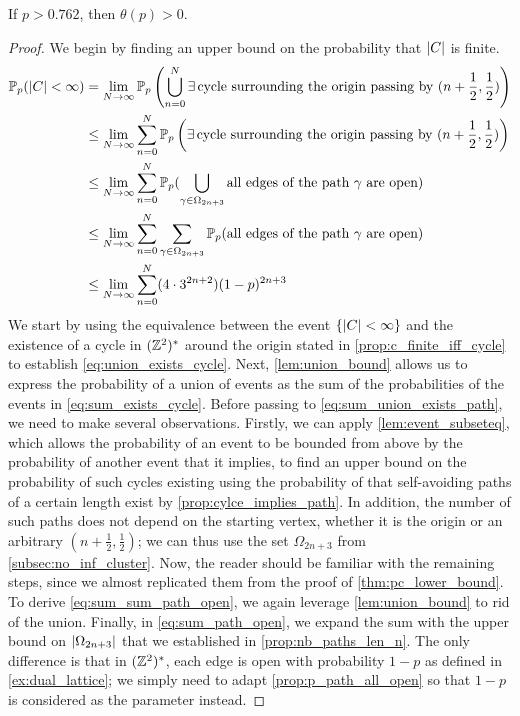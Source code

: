 \documentclass[a4paper, 12pt]{article}
\begin{document}
\begin{thm}\label{thm:pc_higher_bound}
If $p > 0.762$, then $\theta(p) > 0$.
\end{thm}
\begin{proof}
We begin by finding an upper bound on the probability that $\lvert C \rvert$ is finite.
\begin{align}
    \mathbb{P}_p(\lvert C \rvert < \infty)
    &= \lim_{N \to \infty} \mathbb{P}_p\left(\bigcup_{n = 0}^N \exists\,\text{cycle surrounding the origin passing by } (n + \frac{1}{2}, \frac{1}{2})\right)\label{eq:union_exists_cycle}\\
    &\leq \lim_{N \to \infty} \sum_{n = 0}^N \mathbb{P}_p\left(\exists\,\text{cycle surrounding the origin passing by } (n + \frac{1}{2}, \frac{1}{2})\right)\label{eq:sum_exists_cycle}\\
    &\leq \lim_{N \to \infty} \sum_{n = 0}^N \mathbb{P}_p(\bigcup_{\gamma \in \Omega_{2n + 3}} \text{all edges of the path } \gamma \text{ are open})\label{eq:sum_union_exists_path}\\
    &\leq \lim_{N \to \infty} \sum_{n = 0}^N \sum_{\gamma \in \Omega_{2n + 3}} \mathbb{P}_p(\text{all edges of the path } \gamma \text{ are open})\label{eq:sum_sum_path_open}\\
    &\leq \lim_{N \to \infty} \sum_{n = 0}^N (4 \cdot 3^{2n + 2}) (1 - p)^{2n + 3}\label{eq:sum_path_open}
\end{align}
We start by using the equivalence between the event $\{\lvert C \rvert < \infty\}$ and the existence of a cycle in $(\mathbb{Z}^2)^*$ around the origin stated in \cref{prop:c_finite_iff_cycle} to establish \cref{eq:union_exists_cycle}. Next, \cref{lem:union_bound} allows us to express the probability of a union of events as the sum of the probabilities of the events in \cref{eq:sum_exists_cycle}. Before passing to \cref{eq:sum_union_exists_path}, we need to make several observations. Firstly, we can apply \cref{lem:event_subseteq}, which allows the probability of an event to be bounded from above by the probability of another event that it implies, to find an upper bound on the probability of such cycles existing using the probability of that self-avoiding paths of a certain length exist by \cref{prop:cylce_implies_path}. In addition, the number of such paths does not depend on the starting vertex, whether it is the origin or an arbitrary $(n + \frac{1}{2}, \frac{1}{2})$; we can thus use the set $\Omega_{2n + 3}$ from \cref{subsec:no_inf_cluster}. Now, the reader should be familiar with the remaining steps, since we almost replicated them from the proof of \cref{thm:pc_lower_bound}. To derive \cref{eq:sum_sum_path_open}, we again leverage \cref{lem:union_bound} to rid of the union. Finally, in \cref{eq:sum_path_open}, we expand the sum with the upper bound on $\lvert \Omega_{2n + 3} \rvert$ that we established in \cref{prop:nb_paths_len_n}. The only difference is that in $(\mathbb{Z}^2)^*$, each edge is open with probability $1 - p$ as defined in \cref{ex:dual_lattice}; we simply need to adapt \cref{prop:p_path_all_open} so that $1 - p$ is considered as the parameter instead.


\end{proof}
\end{document}
